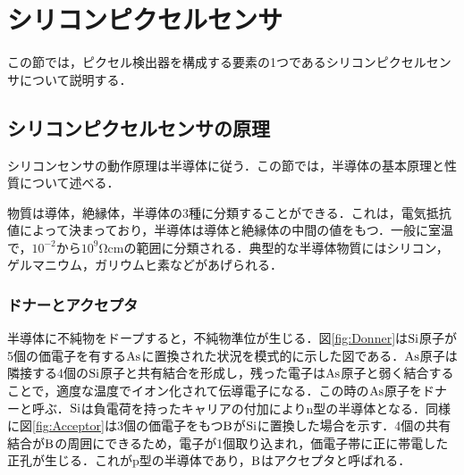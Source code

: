 \section{シリコンピクセルセンサ}
\label{sec:sensor}
この節では，ピクセル検出器を構成する要素の1つであるシリコンピクセルセンサについて説明する．

\subsection{シリコンピクセルセンサの原理}
シリコンセンサの動作原理は半導体に従う．この節では，半導体の基本原理と性質について述べる．\par
物質は導体，絶縁体，半導体の3種に分類することができる．これは，電気抵抗値によって決まっており，半導体は導体と絶縁体の中間の値をもつ．一般に室温で，$10^{-2}$から$10^9 \mathrm{\Omega cm}$の範囲に分類される．典型的な半導体物質にはシリコン，ゲルマニウム，ガリウムヒ素などがあげられる．

\subsubsection*{ドナーとアクセプタ}
半導体に不純物をドープすると，不純物準位が生じる．図\ref{fig:Donner}は$\ce{Si}$原子が5個の価電子を有する$\ce{As}$に置換された状況を模式的に示した図である．$\ce{As}$原子は隣接する4個の$\ce{Si}$原子と共有結合を形成し，残った電子は$\ce{As}$原子と弱く結合することで，適度な温度でイオン化されて伝導電子になる．この時の$\ce{As}$原子をドナーと呼ぶ．$\ce{Si}$は負電荷を持ったキャリアの付加によりn型の半導体となる．同様に図\ref{fig:Acceptor}は3個の価電子をもつ$\ce{B}$が$\ce{Si}$に置換した場合を示す．4個の共有結合が$\ce{B}$の周囲にできるため，電子が1個取り込まれ，価電子帯に正に帯電した正孔が生じる．これがp型の半導体であり，$\ce{B}$はアクセプタと呼ばれる．

